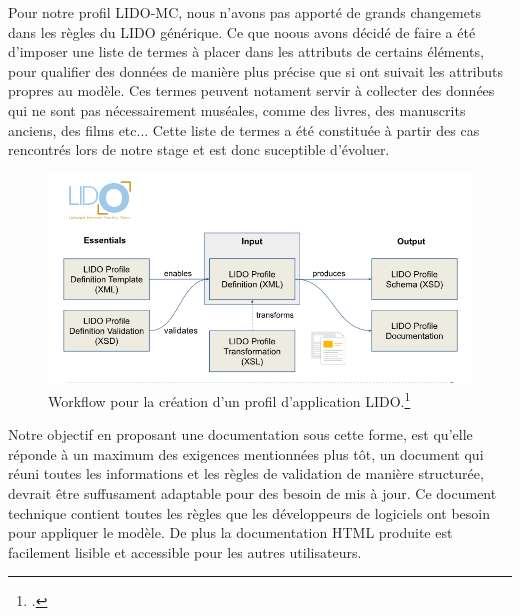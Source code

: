 Pour notre profil LIDO-MC, nous n'avons pas apporté de grands changemets dans les règles du LIDO générique. Ce que noous avons décidé de faire a été d'imposer une liste de termes à placer dans les attributs de certains éléments, pour qualifier des données de manière plus précise que si ont suivait les attributs propres au modèle. Ces termes peuvent notament servir à collecter des données qui ne sont pas nécessairement muséales, comme des livres, des manuscrits anciens, des films etc... Cette liste de termes a été constituée à partir des cas rencontrés lors de notre stage et est donc suceptible d'évoluer. \newline
\begin{figure}[h!]
	\centerline{\includegraphics[width=\textwidth]{medias/Capture d’écran du 2024-09-15 07-21-40.png}}
	\caption{Workflow pour la création d'un profil d'application LIDO.\footcite{lido_primer}}
\end{figure}\newline


Notre objectif en proposant une documentation sous cette forme, est qu'elle réponde à un maximum des exigences mentionnées plus tôt, un document qui réuni toutes les informations et les règles de validation de manière structurée, devrait être suffusament adaptable pour des besoin de mis à jour. Ce document technique contient toutes les règles que les développeurs de logiciels ont besoin pour appliquer le modèle. De plus la documentation HTML produite est facilement lisible et accessible pour les autres utilisateurs. 



